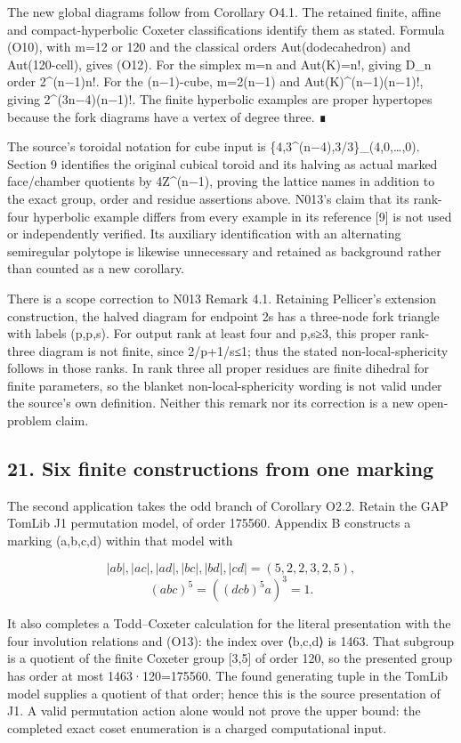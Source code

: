 \documentclass[
  10pt,
  letterpaper,
]{article}
\begin{document}
The new global diagrams follow from Corollary O4.1. The retained finite,
affine and compact-hyperbolic Coxeter classifications identify them as
stated. Formula (O10), with m=12 or 120 and the classical orders
\textbar Aut(dodecahedron) and
\textbar Aut(120-cell), gives (O12). For the simplex m=n
and \textbar Aut(K)\textbar=n!, giving D\_n order 2\^{}(n−1)n!. For the
(n−1)-cube, m=2(n−1) and \textbar Aut(K)\^{}(n−1)(n−1)!,
giving 2\^{}(3n−4)(n−1)!. The finite hyperbolic examples are proper
hypertopes because the fork diagrams have a vertex of degree three. ∎

The source's toroidal notation for cube input is
\{4,3\^{}(n−4),3/3\}\_(4,0,\ldots,0). Section 9 identifies the original
cubical toroid and its halving as actual marked face/chamber quotients
by 4Z\^{}(n−1), proving the lattice names in addition to the exact
group, order and residue assertions above. N013's claim that its
rank-four hyperbolic example differs from every example in its reference
{[}9{]} is not used or independently verified. Its auxiliary
identification with an alternating semiregular polytope is likewise
unnecessary and retained as background rather than counted as a new
corollary.

There is a scope correction to N013 Remark 4.1. Retaining Pellicer's
extension construction, the halved diagram for endpoint 2s has a
three-node fork triangle with labels (p,p,s). For output rank at least
four and p,s≥3, this proper rank-three diagram is not finite, since
2/p+1/s≤1; thus the stated non-local-sphericity follows in those ranks.
In rank three all proper residues are finite dihedral for finite
parameters, so the blanket non-local-sphericity wording is not valid
under the source's own definition. Neither this remark nor its
correction is a new open-problem claim.

\subsection{21. Six finite constructions from one
marking}\label{six-finite-constructions-from-one-marking}

The second application takes the odd branch of Corollary O2.2. Retain
the GAP TomLib J1 permutation model, of order 175560. Appendix B
constructs a marking (a,b,c,d) within that model with

\[
|ab|,|ac|,|ad|,|bc|,|bd|,|cd|=(5,2,2,3,2,5),
\] \[
(abc)^5=((dcb)^5a)^3=1.
\tag{O13}
\]

It also completes a Todd--Coxeter calculation for the literal
presentation with the four involution relations and (O13): the index
over ⟨b,c,d⟩ is 1463. That subgroup is a quotient of the finite Coxeter
group {[}3,5{]} of order 120, so the presented group has order at most
1463·120=175560. The found generating tuple in the TomLib model supplies
a quotient of that order; hence this is the source presentation of J1. A
valid permutation action alone would not prove the upper bound: the
completed exact coset enumeration is a charged computational input.
\end{document}

